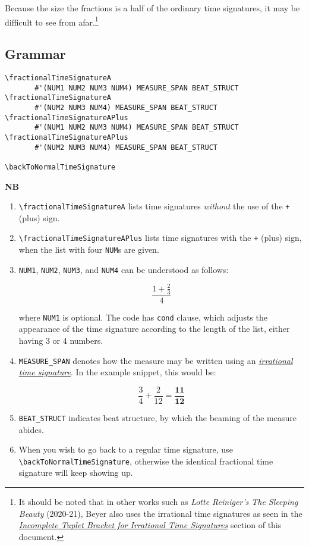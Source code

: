 Because the size the fractions is a half of the ordinary time signatures, it may be difficult to see from afar.\footnote{It should be noted that in other works such as \textit{Lotte Reiniger's The Sleeping Beauty} (2020-21), Beyer also uses the irrational time signatures as seen in the \hyperref[sec:incompleteTuplet]{\textit{Incomplete Tuplet Bracket for Irrational Time Signatures}} section of this document.} 
\label{sec:time_signatures_styleA_convention}

\subsection{Grammar}
\begin{verbatim}
\fractionalTimeSignatureA 
       #'(NUM1 NUM2 NUM3 NUM4) MEASURE_SPAN BEAT_STRUCT
\fractionalTimeSignatureA 
       #'(NUM2 NUM3 NUM4) MEASURE_SPAN BEAT_STRUCT
\fractionalTimeSignatureAPlus 
       #'(NUM1 NUM2 NUM3 NUM4) MEASURE_SPAN BEAT_STRUCT
\fractionalTimeSignatureAPlus 
       #'(NUM2 NUM3 NUM4) MEASURE_SPAN BEAT_STRUCT

\backToNormalTimeSignature

\end{verbatim}
\textbf{NB} 
\begin{enumerate}
\item \verb|\fractionalTimeSignatureA| lists time signatures \textit{without} the use of the \verb|+| (plus) sign. 
\item \verb|\fractionalTimeSignatureAPlus| lists time signatures with the \verb|+| (plus) sign, when the list with four \verb|NUM|s are given.
\item \verb|NUM1|, \verb|NUM2|, \verb|NUM3|, and \verb|NUM4| can be understood as follows: \par
\[ \frac{1+\frac{2}{3}}{4} \] \par
where \verb|NUM1| is optional. The code has \verb|cond| clause, which adjusts the appearance of the time signature according to the length of the list, either having 3 or 4 numbers.
\item \verb|MEASURE_SPAN| denotes how the measure may be written using an \hyperref[sec:incompleteTuplet]{\textit{irrational time signature}}. In the example snippet, this would be: \par
\[ \frac{3}{4} + \frac{2}{12} = \mathbf{\frac{11}{12}}\] \par
\item \verb |BEAT_STRUCT| indicates beat structure, by which the beaming of the measure abides.

\item When you wish to go back to a regular time signature, use \verb|\backToNormalTimeSignature|, otherwise the identical fractional time signature will keep showing up.

\end{enumerate}
